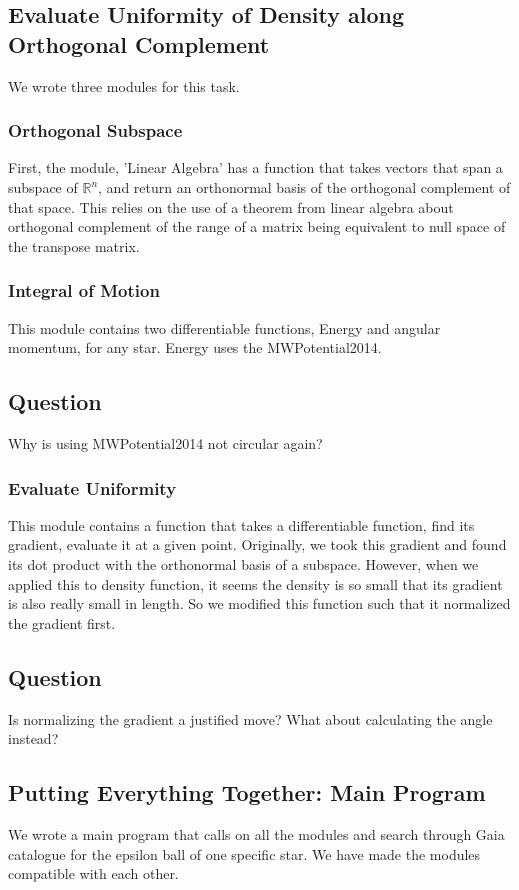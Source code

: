 \documentclass[12pt]{article}
\begin{document}
\subsection{Evaluate Uniformity of Density along Orthogonal Complement}
We wrote three modules for this task. 
\subsubsection{Orthogonal Subspace}
First, the module, 'Linear Algebra' has a function that takes vectors that span a subspace of $\mathbb{R}^n$, and return an orthonormal basis of the orthogonal complement of that space. This relies on the use of a theorem from linear algebra about orthogonal complement of the range of a matrix being equivalent to null space of the transpose matrix.
\subsubsection{Integral of Motion}
This module contains two differentiable functions, Energy and angular momentum, for any star. Energy uses the MWPotential2014.
\subsection*{Question}
Why is using MWPotential2014 not circular again?
\subsubsection{Evaluate Uniformity}
This module contains a function that takes a differentiable function, find its gradient, evaluate it at a given point. Originally, we took this gradient and found its dot product with the orthonormal basis of a subspace. However, when we applied this to density function, it seems the density is so small that its gradient is also really small in length. So we modified this function such that it normalized the gradient first.
\subsection*{Question}
Is normalizing the gradient a justified move? What about calculating the angle instead?
\subsection{Putting Everything Together: Main Program}
We wrote a main program that calls on all the modules and search through Gaia catalogue for the epsilon ball of one specific star. We have made the modules compatible with each other.
\end{document}
